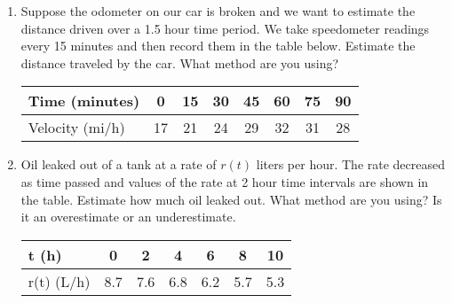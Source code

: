 \documentclass[11pt,fleqn]{article}
\newcommand{\be}{\begin{enumerate}}
\begin{document}
\setlength{\parindent}{0cm}
\renewcommand{\headrulewidth}{0pt}
\newcommand{\blank}[1]{\rule{#1}{0.75pt}}
\renewcommand{\d}{\displaystyle}
\vspace*{-0.7in}
\begin{center}
 {\large{}}
 \end{center}

\be

\item Suppose the odometer on our car is broken and we
want to estimate the distance driven over a 1.5 hour time period. We take speedometer readings every 15 minutes and then
record them in the table below. Estimate the distance traveled by the
car. What method are you using?

\begin{center}
  \begin{tabular}[ht]{|l|c|c|c|c|c|c|c|}
    \hline 
   Time (minutes) & 0 & 15 &30 &45 &60 & 75 & 90 \\
   \hline
   Velocity (mi/h) &17 & 21 & 24 & 29 & 32 & 31 & 28 \\
  \hline
    \end{tabular}
\end{center}  
\vfill

\item Oil leaked out of a tank at a rate of $r(t)$
liters per hour. The rate decreased as time passed and values of the
rate at 2 hour time intervals are shown in the table. Estimate how much oil leaked out. What method are you using? Is it an overestimate or an underestimate.

\begin{center}
  \begin{tabular}[ht]{|l|c|c|c|c|c|c|}
    \hline
    t (h) & 0 & 2 & 4 & 6 & 8 & 10 \\
   \hline
    r(t) (L/h) & 8.7 & 7.6 & 6.8 & 6.2 & 5.7 & 5.3 \\
   \hline
  \end{tabular}
\end{center}
\vfill


\end{enumerate}
\end{document}
